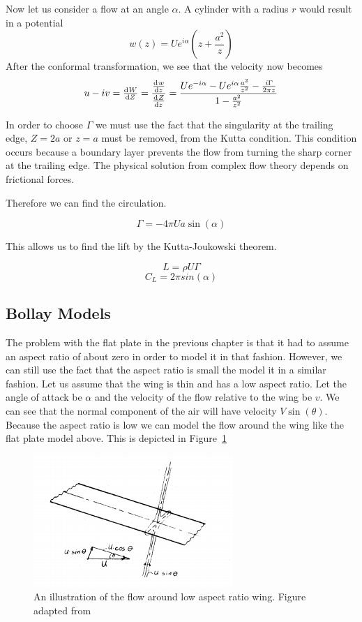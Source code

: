 Now let us consider a flow at an angle $\alpha$. A cylinder with a radius $r$
would result in a potential
\[w(z) = Ue^{i\alpha}(z + \frac{a^2}{z}) \]
After the conformal transformation, we see that the velocity now becomes
\[u - iv = \od{W}{Z} = \frac{\od{w}{z}}{\od{Z}{z}} = \frac{Ue^{-i\alpha}-Ue^{i\alpha}\frac{a^2}{z^2}
- \frac{i \Gamma}{2\pi z}}{1 - \frac{a^2}{z^2}}\]

In order to choose $\Gamma$ we must use the fact that the singularity at the trailing edge, 
$Z=2a$ or $z=a$ must be removed, from the Kutta condition. This condition occurs because 
a boundary layer prevents the flow from turning the sharp corner at the trailing edge.
The physical solution from complex flow theory depends on frictional forces.

Therefore we can find the circulation.

\[ \Gamma = -4\pi Ua \sin(\alpha) \]

This allows us to find the lift by the Kutta-Joukowski theorem.

\[L = \rho U \Gamma\]
\begin{equation}
\label{eq:flat_plat_cl}
C_L = 2\pi sin(\alpha)
\end{equation}

\subsection{Bollay Models}

The problem with the flat plate in the previous chapter is that it had to assume 
an aspect ratio of about zero in order to model it in that fashion. However, we can still
use the fact that the aspect ratio is small the model it in a similar fashion.
Let us assume that the wing is thin and has a low aspect ratio. Let the angle of attack
 be $\alpha$ and the velocity of the flow relative to the wing be $v$. 
 We can see that the normal component of the air
will have velocity $V\sin(\theta)$. Because the aspect ratio is low
we can model the flow around the wing like the flat plate model above.
This is depicted in Figure~\ref{fig:bollay1}

\begin{figure}[hl]
  \centering
    \includegraphics[scale=1]{figures/bollay1.png}
    \caption{An illustration of the flow around low aspect ratio wing. Figure adapted from~\cite{bollay}}
  \label{fig:bollay1}
\end{figure}


